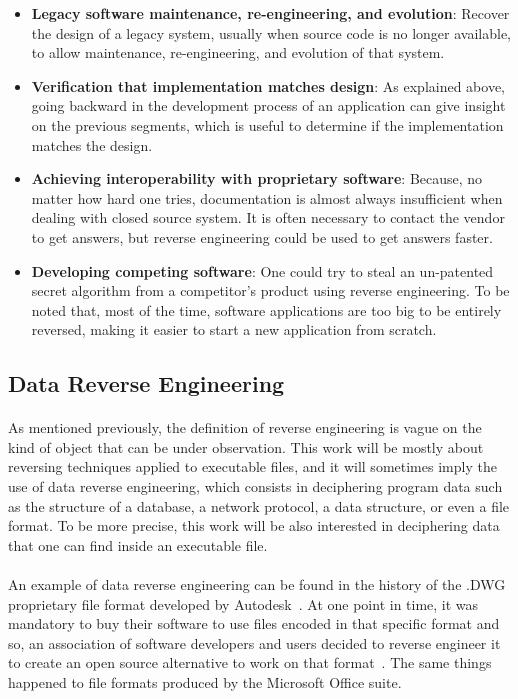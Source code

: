 \begin{itemize}
	\item \textbf{Legacy software maintenance, re-engineering, and evolution}: Recover the design of a legacy system, usually when source code is no longer available, to allow maintenance, re-engineering, and evolution of that system.
	\item \textbf{Verification that implementation matches design}: As explained above, going backward in the development process of an application can give insight on the previous segments, which is useful to determine if the implementation matches the design.
	\item \textbf{Achieving interoperability with proprietary software}: Because, no matter how hard one tries, documentation is almost always insufficient when dealing with closed source system. It is often necessary to contact the vendor to get answers, but reverse engineering could be used to get answers faster.
	\item \textbf{Developing competing software}: One could try to steal an un-patented secret algorithm from a competitor's product using reverse engineering. To be noted that, most of the time, software applications are too big to be entirely reversed, making it easier to start a new application from scratch. 
\end{itemize}

\subsection{Data Reverse Engineering}
\paragraph{}
As mentioned previously, the definition of reverse engineering is vague on the kind of object that can be under observation. This work will be mostly about reversing techniques applied to executable files, and it will sometimes imply the use of data reverse engineering, which consists in deciphering program data such as the structure of a database, a network protocol, a data structure, or even a file format. To be more precise, this work will be also interested in deciphering data that one can find inside an executable file.

\paragraph{}
An example of data reverse engineering can be found in the history of the .DWG proprietary file format developed by Autodesk~\cite{dwg}. At one point in time, it was mandatory to buy their software to use files encoded in that specific format and so, an association of software developers and users decided to reverse engineer it to create an open source alternative to work on that format~\cite{WebcitationOpenDesignAlliance}. The same things happened to file formats produced by the Microsoft Office suite.

